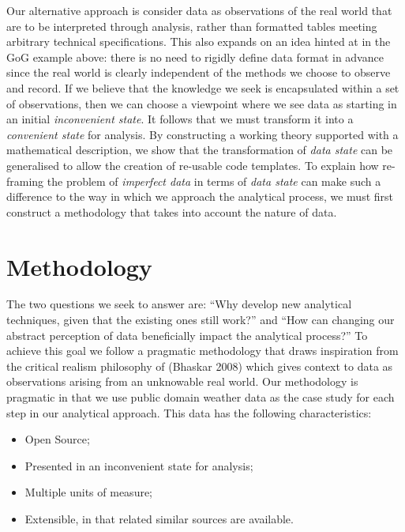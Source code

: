 \documentclass[smallextended]{svjour3}       %
\providecommand{\tightlist}{%
  \setlength{\itemsep}{0pt}\setlength{\parskip}{0pt}}
\begin{document}
Our alternative approach is consider data as observations of the real world that are to be interpreted through analysis, rather than formatted tables meeting arbitrary technical specifications. This also expands on an idea hinted at in the GoG example above: there is no need to rigidly define data format in advance since the real world is clearly independent of the methods we choose to observe and record. If we believe that the knowledge we seek is encapsulated within a set of observations, then we can choose a viewpoint where we see data as starting in an initial \emph{inconvenient state}. It follows that we must transform it into a \emph{convenient state} for analysis. By constructing a working theory supported with a mathematical description, we show that the transformation of \emph{data state} can be generalised to allow the creation of re-usable code templates. To explain how re-framing the problem of \emph{imperfect data} in terms of \emph{data state} can make such a difference to the way in which we approach the analytical process, we must first construct a methodology that takes into account the nature of data.

\hypertarget{sec:methodology}{%
\section{Methodology}\label{sec:methodology}}

The two questions we seek to answer are: ``Why develop new analytical techniques, given that the existing ones still work?'' and ``How can changing our abstract perception of data beneficially impact the analytical process?'' To achieve this goal we follow a pragmatic methodology that draws inspiration from the critical realism philosophy of (Bhaskar 2008) which gives context to data as observations arising from an unknowable real world. Our methodology is pragmatic in that we use public domain weather data as the case study for each step in our analytical approach. This data has the following characteristics:

\begin{itemize}
\tightlist
\item
  Open Source;
\item
  Presented in an inconvenient state for analysis;
\item
  Multiple units of measure;
\item
  Extensible, in that related similar sources are available.
\end{itemize}
\end{document}
